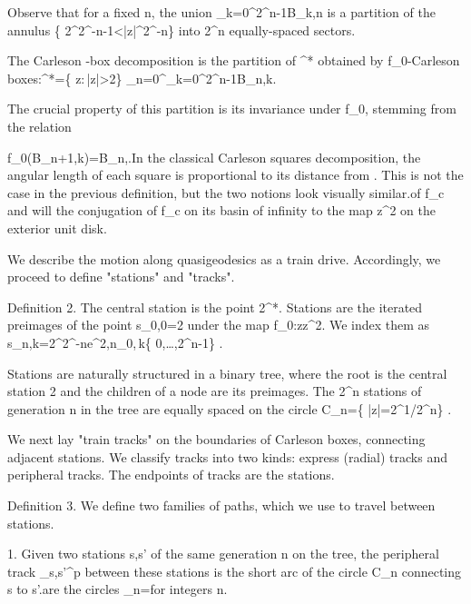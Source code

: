 \documentclass[12pt]{article}
\numberwithin{equation}{section}
\theoremstyle{remark}
\theoremstyle{definition}
\begin{document}
Observe that for a fixed n, the union \bigsqcup_{k=0}^{2^{n}-1}B_{k,n} is a partition of the annulus \left\{ 2^{2^{-n-1}}<\left|z\right|^{2^{-n}}\right\}  into 2^{n} equally-spaced sectors.

The Carleson -box decomposition is the partition of \D^{*} obtained by f_{0}-Carleson boxes:\D^{*}=\left\{ z:\,\left|z\right|>2\right\} \sqcup\bigsqcup_{n=0}^{\infty}\bigsqcup_{k=0}^{2^{n}-1}B_{n,k}.

The crucial property of this partition is its invariance under f_{0}, stemming from the relation

f_{0}\left(B_{n+1,k}\right)=B_{n,\lfloor{}\rfloor}.In the classical Carleson squares decomposition, the angular length of each square is proportional to its distance from \partial\D. This is not the case in the previous definition, but the two notions look visually similar.of f_{c} and will the conjugation of f_{c} on its basin of infinity to the map z^{2} on the exterior unit disk.



We describe the motion along quasigeodesics as a train drive. Accordingly, we proceed to define "stations" and "tracks".

Definition 2. The central station is the point 2\in\D^{*}. Stations are the iterated preimages of the point s_{0,0}=2 under the map f_{0}:z\mapsto z^{2}. We index them as s_{n,k}=2^{2^{-n}}e^{2\pi},\qquad n\in\N_{0},\,k\in\left\{ 0,\ldots,2^{n}-1\right\} .

Stations are naturally structured in a binary tree, where the root is the central station 2 and the children of a node are its preimages. The 2^{n} stations of generation n in the tree are equally spaced on the circle C_{n}=\left\{ \left|z\right|=2^{1/2^{n}}\right\} .



We next lay "train tracks" on the boundaries of Carleson boxes, connecting adjacent stations. We classify tracks into two kinds: express (radial) tracks and peripheral tracks. The endpoints of tracks are the stations.

Definition 3. We define two families of paths, which we use to travel between stations.

1. Given two stations s,s' of the same generation n on the tree, the peripheral track \gamma_{s,s'}^{p} between these stations is the short arc of the circle C_{n} connecting s to s'.are the circles \delta_{n}=for integers n. 
\end{document}
